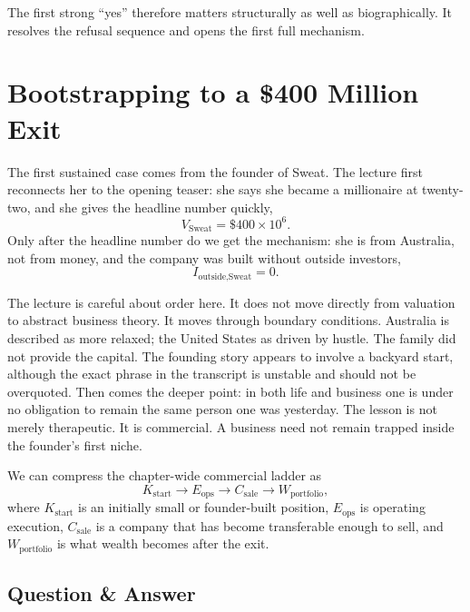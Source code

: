 The first strong ``yes'' therefore matters structurally as well as biographically. It resolves the refusal sequence and opens the first full mechanism.

\section{Bootstrapping to a \$400 Million Exit}

The first sustained case comes from the founder of Sweat. The lecture first reconnects her to the opening teaser: she says she became a millionaire at twenty-two, and she gives the headline number quickly,
\begin{equation}
V_{\text{Sweat}}=\$400\times 10^6.
\end{equation}
Only after the headline number do we get the mechanism: she is from Australia, not from money, and the company was built without outside investors,
\begin{equation}
I_{\text{outside,Sweat}}=0.
\end{equation}

The lecture is careful about order here. It does not move directly from valuation to abstract business theory. It moves through boundary conditions. Australia is described as more relaxed; the United States as driven by hustle. The family did not provide the capital. The founding story appears to involve a backyard start, although the exact phrase in the transcript is unstable and should not be overquoted. Then comes the deeper point: in both life and business one is under no obligation to remain the same person one was yesterday. The lesson is not merely therapeutic. It is commercial. A business need not remain trapped inside the founder's first niche.

We can compress the chapter-wide commercial ladder as
\begin{equation}
K_{\text{start}} \to E_{\text{ops}} \to C_{\text{sale}} \to W_{\text{portfolio}},
\end{equation}
where \(K_{\text{start}}\) is an initially small or founder-built position, \(E_{\text{ops}}\) is operating execution, \(C_{\text{sale}}\) is a company that has become transferable enough to sell, and \(W_{\text{portfolio}}\) is what wealth becomes after the exit.

\subsection{Question \& Answer}


